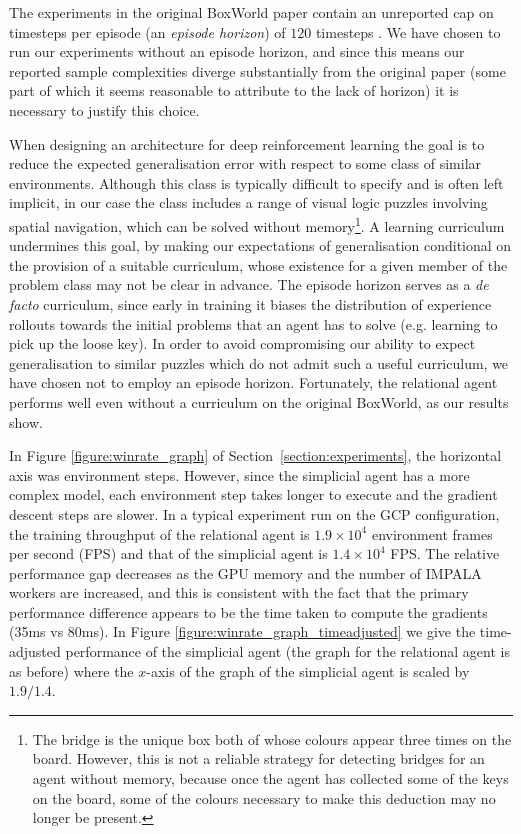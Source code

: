 \documentclass{article} %
\begin{document}
The experiments in the original BoxWorld paper \citep{zambaldi} contain an unreported cap on timesteps per episode (an \emph{episode horizon}) of $120$ timesteps \citep{personal}. We have chosen to run our experiments without an episode horizon, and since this means our reported sample complexities diverge substantially from the original paper (some part of which it seems reasonable to attribute to the lack of horizon) it is necessary to justify this choice.

When designing an architecture for deep reinforcement learning the goal is to reduce the expected generalisation error \cite[\S 8.1.1]{dlbook} with respect to some class of similar environments. Although this class is typically difficult to specify and is often left implicit, in our case the class includes a range of visual logic puzzles involving spatial navigation, which can be solved without memory\footnote{The bridge is the unique box both of whose colours appear three times on the board. However, this is not a reliable strategy for detecting bridges for an agent without memory, because once the agent has collected some of the keys on the board, some of the colours necessary to make this deduction may no longer be present.}. A learning curriculum undermines this goal, by making our expectations of generalisation conditional on the provision of a suitable curriculum, whose existence for a given member of the problem class may not be clear in advance. The episode horizon serves as a \emph{de facto} curriculum, since early in training it biases the distribution of experience rollouts towards the initial problems that an agent has to solve (e.g. learning to pick up the loose key). In order to avoid compromising our ability to expect generalisation to similar puzzles which do not admit such a useful curriculum, we have chosen not to employ an episode horizon. Fortunately, the relational agent performs well even without a curriculum on the original BoxWorld, as our results show.

In Figure \ref{figure:winrate_graph} of Section~\ref{section:experiments}, the horizontal axis was environment steps. However, since the simplicial agent has a more complex model, each environment step takes longer to execute and the gradient descent steps are slower. In a typical experiment run on the GCP configuration, the training throughput of the relational agent is $1.9 \times 10^4$ environment frames per second (FPS) and that of the simplicial agent is $1.4 \times 10^4$ FPS. The relative performance gap decreases as the GPU memory and the number of IMPALA workers are increased, and this is consistent with the fact that the primary performance difference appears to be the time taken to compute the gradients (35ms vs 80ms). In Figure \ref{figure:winrate_graph_timeadjusted} we give the time-adjusted performance of the simplicial agent (the graph for the relational agent is as before) where the $x$-axis of the graph of the simplicial agent is scaled by $1.9/1.4$. 
\end{document}
